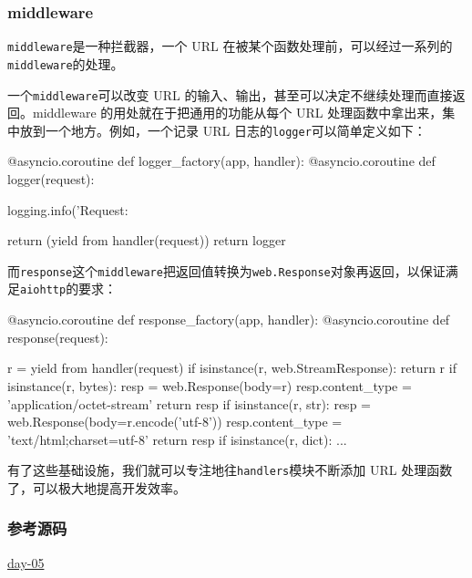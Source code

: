 \hypertarget{middleware}{%
\subsubsection{middleware}\label{middleware}}

\texttt{middleware}是一种拦截器，一个 URL
在被某个函数处理前，可以经过一系列的\texttt{middleware}的处理。

一个\texttt{middleware}可以改变 URL
的输入、输出，甚至可以决定不继续处理而直接返回。middleware
的用处就在于把通用的功能从每个 URL
处理函数中拿出来，集中放到一个地方。例如，一个记录 URL
日志的\texttt{logger}可以简单定义如下：

\begin{pythoncode}
@asyncio.coroutine
def logger_factory(app, handler):
    @asyncio.coroutine
    def logger(request):
        
        logging.info('Request: %
        
        return (yield from handler(request))
    return logger
\end{pythoncode}

而\texttt{response}这个\texttt{middleware}把返回值转换为\texttt{web.Response}对象再返回，以保证满足\texttt{aiohttp}的要求：

\begin{pythoncode}
@asyncio.coroutine
def response_factory(app, handler):
    @asyncio.coroutine
    def response(request):
        
        r = yield from handler(request)
        if isinstance(r, web.StreamResponse):
            return r
        if isinstance(r, bytes):
            resp = web.Response(body=r)
            resp.content_type = 'application/octet-stream'
            return resp
        if isinstance(r, str):
            resp = web.Response(body=r.encode('utf-8'))
            resp.content_type = 'text/html;charset=utf-8'
            return resp
        if isinstance(r, dict):
            ...
\end{pythoncode}

有了这些基础设施，我们就可以专注地往\texttt{handlers}模块不断添加 URL
处理函数了，可以极大地提高开发效率。

\hypertarget{ux53c2ux8003ux6e90ux7801}{%
\subsubsection{参考源码}\label{ux53c2ux8003ux6e90ux7801}}

\href{https://github.com/michaelliao/awesome-python3-webapp/tree/day-05}{day-05}

